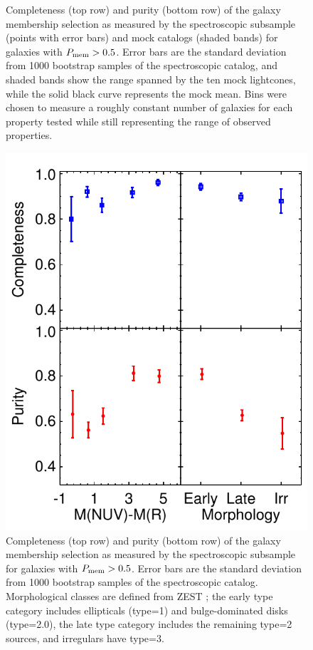 \begin{figure}
\caption{Completeness (top row) and purity (bottom row) of the galaxy
  membership selection as measured by the
  spectroscopic subsample (points with error bars) and mock catalogs
  (shaded bands) for galaxies with $P_{\rm mem}>0.5$. Error bars are
  the standard deviation from 1000 bootstrap samples of the
  spectroscopic catalog, and shaded bands show the range spanned by the
  ten mock lightcones, while the solid black curve represents the mock
  mean. Bins were chosen to measure a roughly constant number of galaxies for each 
  property tested while still representing the range of observed properties.}
\label{cat_fig:memstat_all}
\end{figure}

\begin{figure}
\begin{center}
\includegraphics[scale=1]{catalog/f6.pdf}
\caption{Completeness (top row) and purity (bottom row) of the galaxy
  membership selection as measured by the
  spectroscopic subsample for galaxies with $P_{\rm mem}>0.5$. Error bars are
  the standard deviation from 1000 bootstrap samples of the
  spectroscopic catalog. Morphological classes are defined from ZEST
  \citep{Scarlata2007}; the early type category includes ellipticals
  (type=1) and bulge-dominated disks (type=2.0), the late type
  category includes the remaining type=2 sources, and irregulars
  have type=3.} 
\label{cat_fig:memstat_color}
\end{center}
\end{figure}

